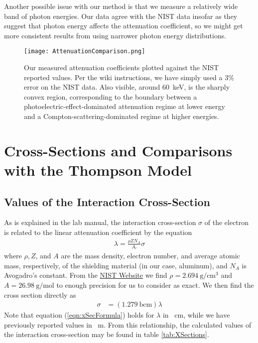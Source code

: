 \documentclass[letter]{article}
\begin{document}
Another possible issue with our method is that we measure a relatively wide band of photon energies. Our data agree with the NIST data insofar as they suggest that photon energy affects the attenuation coefficient, so we might get more consistent results from using narrower photon energy distributions.

\begin{figure}[h] \centering
    \texttt{[image: AttenuationComparison.png]}
    \caption{Our measured attenuation coefficients plotted against the NIST reported values. Per the wiki instructions, we have simply used a 3\% error on the NIST data. Also visible, around \qty{60}{\kilo\electronvolt}, is the sharply convex region, corresponding to the boundary between a photoelectric-effect-dominated attenuation regime at lower energy and a Compton-scattering-dominated regime at higher energies.}
    \label{fig:AttenComp}
\end{figure}


\section{Cross-Sections and Comparisons with the Thompson Model}

\subsection{Values of the Interaction Cross-Section}

As is explained in the lab manual, the interaction cross-section $\sigma$ of the electron is related to the linear attenuation coefficient by the equation
\begin{align}
\lambda = \frac{\rho Z N_A}{A_r} \sigma
\end{align}
where $\rho, Z$, and $A$ are the mass density, electron number, and average atomic mass, respectively, of the shielding material (in our case, aluminum), and $N_A$ is Avogadro's constant. From the \href{https://physics.nist.gov/cgi-bin/ffast/ffast.pl?Formula=Al&gtype=0&lower=&upper=&density=}{NIST Website} we find $\rho = \qty{2.694}{\g\per\cm\cubed}$ and ${A = \qty{26.98}{\g\per\mol}}$ to enough precision for us to consider as exact. We then find the cross section directly as
\begin{align}
\sigma &= \left( \qty{1.279}{\barn\cm} \right)  \lambda  \label{eqn:xSecFormula}
\end{align} 
Note that equation (\ref{eqn:xSecFormula}) holds for $\lambda$ in \unit{\per\cm}, while we have previously reported values in \unit{\per\m}. From this relationship, the calculated values of the interaction cross-section may be found in table \ref{tab:XSections}.
\end{document}
